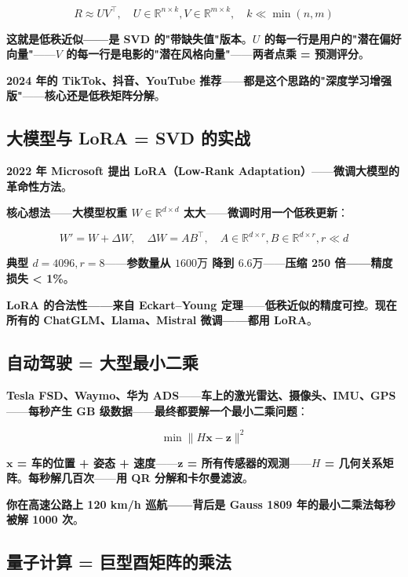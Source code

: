 \[
R \approx U V^{\!\top}, \quad U \in \mathbb{R}^{n \times k}, V \in \mathbb{R}^{m \times k}, \quad k \ll \min(n, m)
\]

\textbf{这就是\textbf{低秩近似}——\textbf{是 SVD 的"带缺失值"版本}}。\textbf{$U$ 的每一行是\textbf{用户的"潜在偏好向量"}}——\textbf{$V$ 的每一行是\textbf{电影的"潜在风格向量"}}——\textbf{两者点乘 = 预测评分}。

\textbf{2024 年的 TikTok、抖音、YouTube 推荐}——\textbf{都是这个思路的"深度学习增强版"}——\textbf{核心还是低秩矩阵分解}。

\subsection{大模型与 LoRA = SVD 的实战}

\textbf{2022 年 Microsoft 提出 LoRA（Low-Rank Adaptation）}——\textbf{微调大模型的革命性方法}。

\textbf{核心想法}——\textbf{大模型权重 $W \in \mathbb{R}^{d \times d}$ 太大}——\textbf{微调时用一个低秩更新}：

\[
W' = W + \Delta W, \quad \Delta W = A B^{\!\top}, \quad A \in \mathbb{R}^{d \times r}, B \in \mathbb{R}^{d \times r}, r \ll d
\]

\textbf{典型 $d = 4096, r = 8$}——\textbf{参数量从 $1600 万$ 降到 $6.6 万$}——\textbf{压缩 250 倍——精度损失 < 1\%}。

\textbf{LoRA 的合法性——来自 Eckart--Young 定理}——\textbf{低秩近似的精度可控}。\textbf{现在所有的 ChatGLM、Llama、Mistral 微调——都用 LoRA}。

\subsection{自动驾驶 = 大型最小二乘}

\textbf{Tesla FSD、Waymo、华为 ADS}——\textbf{车上的激光雷达、摄像头、IMU、GPS}——\textbf{每秒产生 GB 级数据}——\textbf{最终都要解一个最小二乘问题}：

\[
\min \|H \bm{x} - \bm{z}\|^2
\]

\textbf{$\bm{x}$ = 车的位置 + 姿态 + 速度}——\textbf{$\bm{z}$ = 所有传感器的观测}——\textbf{$H$ = 几何关系矩阵}。\textbf{每秒解几百次}——\textbf{用 QR 分解和卡尔曼滤波}。

\textbf{你在高速公路上 120 km/h 巡航——背后是 Gauss 1809 年的最小二乘法每秒被解 1000 次}。

\subsection{量子计算 = 巨型酉矩阵的乘法}

